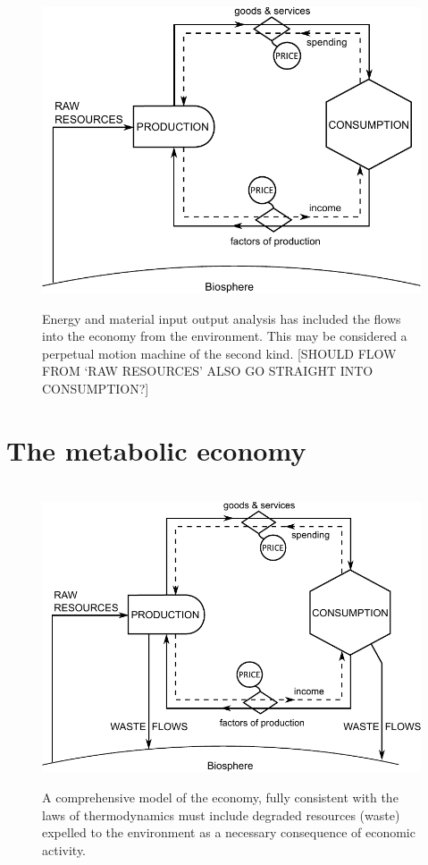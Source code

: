 \begin{figure}[!ht]
\centering\
\includegraphics[width=\linewidth]{Part_0/Chapter_Introduction/images/Perpetual_motion_2.pdf}
\caption[The traditional model supplemented with resource inputs]{Energy 
and material input output analysis has included the flows into the economy from the environment.
This may be considered a perpetual motion machine 
of the second kind.
[SHOULD FLOW FROM `RAW RESOURCES' ALSO GO STRAIGHT INTO CONSUMPTION?]}
\label{fig:perp_motion_2}
\end{figure}

\section{The metabolic economy}

\begin{figure}[!ht]
\centering\
\includegraphics[width=\linewidth]{Part_0/Chapter_Introduction/images/PERKS.pdf}
\caption[A comprehensive biophysical (?) model of the economy]{A comprehensive model 
of the economy, fully consistent with the laws of thermodynamics 
must include degraded resources (waste) expelled 
to the environment as a necessary consequence of economic activity.}
\label{fig:metabolic_economy}
\end{figure}


